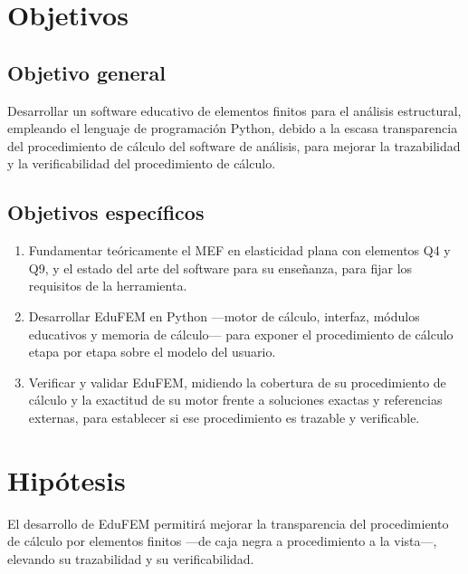 \section*{Objetivos}

\subsection*{Objetivo general}

Desarrollar un software educativo de elementos finitos para el análisis estructural, empleando el lenguaje de programación Python, debido a la escasa transparencia del procedimiento de cálculo del software de análisis, para mejorar la trazabilidad y la verificabilidad del procedimiento de cálculo.

\subsection*{Objetivos específicos}

\begin{enumerate}
    \item Fundamentar teóricamente el MEF en elasticidad plana con elementos Q4 y Q9, y el estado del arte del software para su enseñanza, para fijar los requisitos de la herramienta.
    \item Desarrollar EduFEM en Python ---motor de cálculo, interfaz, módulos educativos y memoria de cálculo--- para exponer el procedimiento de cálculo etapa por etapa sobre el modelo del usuario.
    \item Verificar y validar EduFEM, midiendo la cobertura de su procedimiento de cálculo y la exactitud de su motor frente a soluciones exactas y referencias externas, para establecer si ese procedimiento es trazable y verificable.
\end{enumerate}

\section*{Hipótesis}

El desarrollo de EduFEM permitirá mejorar la transparencia del procedimiento de cálculo por elementos finitos ---de caja negra a procedimiento a la vista---, elevando su trazabilidad y su verificabilidad.

